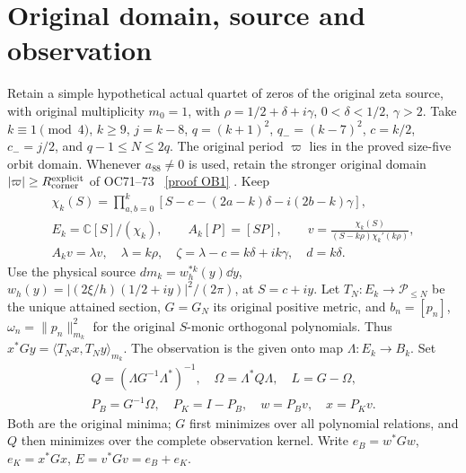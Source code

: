 \documentclass[11pt]{article}
\newcommand{\C}{\mathbb C}\newcommand{\R}{\mathbb R}
\begin{document}
\section{Original domain, source and observation}
Retain a simple hypothetical actual quartet of zeros of the original zeta
source, with original multiplicity $m_0=1$, with $\rho=1/2+\delta+i\gamma$, $0<\delta<1/2$, $\gamma>2$.
Take $k\equiv1\pmod4$, $k\ge9$, $j=k-8$, $q=(k+1)^2$,
$q_-=(k-7)^2$, $c=k/2$, $c_-=j/2$, and $q-1\le N\le2q$.
The original period $\varpi$ lies in the proved size-five orbit domain.
Whenever $a_{88}\ne0$ is used, retain the stronger original domain
$|\varpi|\ge R_{\rm corner}^{\rm explicit}$ of OC71--73 \cite{CPOB}%
~\href{https://github.com/KokunoYumeto/zeta-function-research-reader/blob/487253b5b01851da5b9b98af4e146fecf1fab902/workbenches/splitzero-tandem/continuations/20260920-heat-literature-observed-class/HEAT_LITERATURE_AND_OBSERVED_CLASS.tex\#L1223}{[proof OB1]}%
{}.
Keep
\begin{equation}\tag{CP1}
 \begin{gathered}
 \chi_k(S)=\prod_{a,b=0}^k
 [S-c-(2a-k)\delta-i(2b-k)\gamma],\\
 E_k=\C[S]/(\chi_k),\qquad A_k[P]=[SP],\qquad
 v=\frac{\chi_k(S)}{(S-k\rho)\chi_k'(k\rho)},\\
 A_kv=\lambda v,\quad \lambda=k\rho,\quad
 \zeta=\lambda-c=k\delta+ik\gamma,\quad d=k\delta.
 \end{gathered}
\end{equation}
Use the physical source $dm_k=w_h^{*k}(y)\dd y$,
$w_h(y)=|(2\xi/h)(1/2+iy)|^2/(2\pi)$, at $S=c+iy$.
Let $T_N:E_k\to\mathcal P_{\le N}$ be the unique attained section,
$G=G_N$ its original positive metric, and
$b_n=[p_n]$, $\omega_n=\|p_n\|_{m_k}^2$ for the original $S$-monic
orthogonal polynomials. Thus $x^*Gy=\langle T_Nx,T_Ny\rangle_{m_k}$.
The observation is the given onto map $\Lambda:E_k\to B_k$.
Set
\begin{equation}\tag{CP2}
 \begin{gathered}
 Q=(\Lambda G^{-1}\Lambda^*)^{-1},\quad
 \Omega=\Lambda^*Q\Lambda,\quad L=G-\Omega,\\
 P_B=G^{-1}\Omega,\quad P_K=I-P_B,
 \quad w=P_Bv,\quad x=P_Kv.
 \end{gathered}
\end{equation}
Both are the original minima; $G$ first minimizes over all polynomial
relations, and $Q$ then minimizes over the complete observation kernel.
Write $e_B=w^*Gw$, $e_K=x^*Gx$, $E=v^*Gv=e_B+e_K$.
\end{document}
